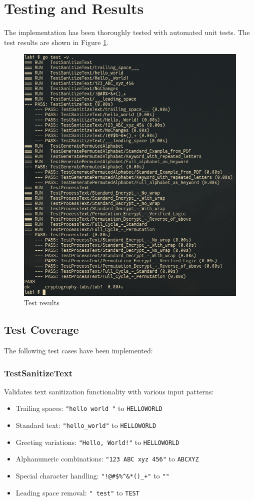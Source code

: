 \documentclass[a4paper,12pt]{article}
\begin{document}
\section{Testing and Results}
\label{sec:orgf8d9fcf}
The implementation has been thoroughly tested with automated unit tests. The test results are shown in Figure \ref{fig:org89413a5}.
\begin{figure}[htbp]
\centering
\includegraphics[width=.9\linewidth]{./results/tests.png}
\caption{\label{fig:org89413a5}Test results}
\end{figure}
\subsection{Test Coverage}
\label{sec:org4cac38e}
The following test cases have been implemented:
\subsubsection{TestSanitizeText}
\label{sec:org08114ad}
Validates text sanitization functionality with various input patterns:
\begin{itemize}
\item Trailing spaces: \texttt{"hello world "} to \texttt{HELLOWORLD}
\item Standard text: \texttt{"hello\_world"} to \texttt{HELLOWORLD}
\item Greeting variations: \texttt{"Hello, World!"} to \texttt{HELLOWORLD}
\item Alphanumeric combinations: \texttt{"123 ABC xyz 456"} to \texttt{ABCXYZ}
\item Special character handling: \texttt{"!@\#\$\%\textasciicircum{}\&*()\_+"} to \texttt{""}
\item Leading space removal: \texttt{" test"} to \texttt{TEST}
\end{itemize}
\end{document}
